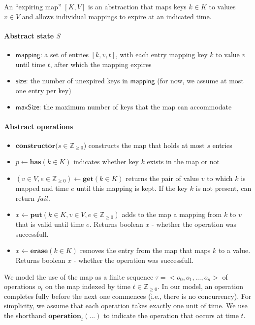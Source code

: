 \documentclass{article}
\renewcommand{\o}[1]{\ensuremath{\mathbf{#1}}}
\newcommand{\s}[1]{\ensuremath{\mathsf{#1}}}
\newcommand{\nintset}{\ensuremath{\mathds{Z}_{\ge 0}}}
\begin{document}
An ``expiring map'' $[K,V]$ is an abstraction that maps keys $k \in K$ to values $v \in V$ and allows individual mappings to expire at an indicated time.

\paragraph{Abstract state $S$}
\begin{itemize}
   \item \s{mapping}: a set of entries $[k,v,t]$, with each entry mapping key $k$ to value $v$ until time $t$, after which the mapping expires
   \item \s{size}: the number of unexpired keys in \s{mapping} (for now, we assume at most one entry per key)
   \item \s{maxSize}: the maximum number of keys that the map can accommodate
\end{itemize}

\paragraph{Abstract operations}
\begin{itemize}
\item $\o{constructor}(s \in \nintset$) constructs the map that holds at most $s$ entries
\item $p\gets \o{has}(k \in K)$ indicates whether key $k$ exists in the map or not
\item $(v\in V, e\in \nintset)\gets \o{get}(k \in K)$ returns the pair of value $v$ to which $k$ is mapped and time $e$ until this mapping is kept. If the key $k$ is not present, can return $fail$.
\item $x\gets \o{put}(k \in K, v \in V, e \in \nintset)$ adds to the map a mapping from $k$ to $v$ that is valid until time $e$. Returns boolean $x$ - whether the operation was successfull.
\item $x\gets \o{erase}(k \in K)$ removes the entry from the map that maps $k$ to a value. Returns boolean $x$ - whether the operation was successfull.
\end{itemize}

We model the use of the map as a finite sequence
$\tau = <o_0, o_1, ..., o_n>$
of operations $o_t$ on the map indexed by time $t \in \nintset$.
In our model, an operation completes fully before the next one commences (i.e., there is no concurrency).
For simplicity, we assume that each operation takes exactly one unit of time.
We use the shorthand $\o{operation}_t(...)$ to indicate the operation that occurs at time $t$.
\end{document}
